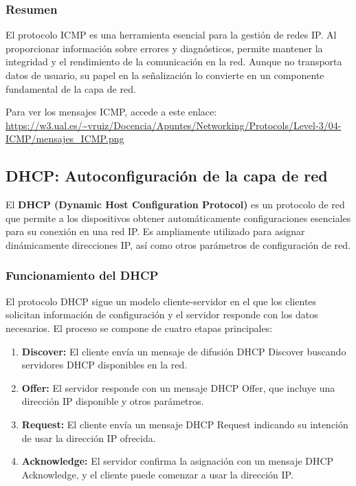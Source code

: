 \documentclass[a4paper,12pt]{article}
\begin{document}
\subsubsection*{Resumen}

El protocolo ICMP es una herramienta esencial para la gestión de redes IP. Al proporcionar información sobre errores y diagnósticos, permite mantener la integridad y el rendimiento de la comunicación en la red. Aunque no transporta datos de usuario, su papel en la señalización lo convierte en un componente fundamental de la capa de red.


Para ver los mensajes ICMP, accede a este enlace: \url{https://w3.ual.es/~vruiz/Docencia/Apuntes/Networking/Protocols/Level-3/04-ICMP/mensajes_ICMP.png}







\subsection{DHCP: Autoconfiguración de la capa de red}


El \textbf{DHCP (Dynamic Host Configuration Protocol)} es un protocolo de red que permite a los dispositivos obtener automáticamente configuraciones esenciales para su conexión en una red IP. Es ampliamente utilizado para asignar dinámicamente direcciones IP, así como otros parámetros de configuración de red.

\subsubsection*{Funcionamiento del DHCP}

El protocolo DHCP sigue un modelo cliente-servidor en el que los clientes solicitan información de configuración y el servidor responde con los datos necesarios. El proceso se compone de cuatro etapas principales:
\begin{enumerate}
    \item \textbf{Discover:} El cliente envía un mensaje de difusión DHCP Discover buscando servidores DHCP disponibles en la red.
    \item \textbf{Offer:} El servidor responde con un mensaje DHCP Offer, que incluye una dirección IP disponible y otros parámetros.
    \item \textbf{Request:} El cliente envía un mensaje DHCP Request indicando su intención de usar la dirección IP ofrecida.
    \item \textbf{Acknowledge:} El servidor confirma la asignación con un mensaje DHCP Acknowledge, y el cliente puede comenzar a usar la dirección IP.
\end{enumerate}
\end{document}
